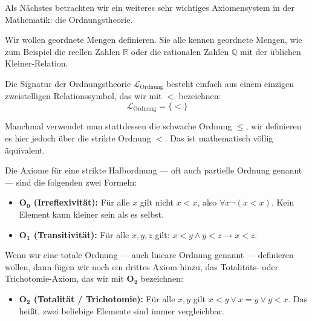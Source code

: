 \begin{spoken-clean}[01:20:42 - 01:23:42]
Als Nächstes betrachten wir ein weiteres sehr wichtiges Axiomensystem in der Mathematik: die Ordnungstheorie. 

Wir wollen geordnete Mengen definieren. Sie alle kennen geordnete Mengen, wie zum Beispiel die reellen Zahlen $\mathbb{R}$ oder die rationalen Zahlen $\mathbb{Q}$ mit der üblichen Kleiner-Relation. 

Die Signatur der Ordnungstheorie $\mathcal{L}_{\text{Ordnung}}$ besteht einfach aus einem einzigen zweistelligen Relationssymbol, das wir mit $<$ bezeichnen:
\[ \mathcal{L}_{\text{Ordnung}} = \{<\} \]

Manchmal verwendet man stattdessen die schwache Ordnung $\le$, wir definieren es hier jedoch über die strikte Ordnung $<$. Das ist mathematisch völlig äquivalent. 

Die Axiome für eine strikte Halbordnung --- oft auch partielle Ordnung genannt --- sind die folgenden zwei Formeln:
\begin{itemize}
    \item \textbf{O$_{\mathbf{0}}$ (Irreflexivität):} Für alle $x$ gilt nicht $x < x$, also $\forall x \neg(x < x)$. Kein Element kann kleiner sein als es selbst.
    \item \textbf{O$_{\mathbf{1}}$ (Transitivität):} Für alle $x, y, z$ gilt: $x < y \wedge y < z \rightarrow x < z$.
\end{itemize}

Wenn wir eine totale Ordnung --- auch lineare Ordnung genannt --- definieren wollen, dann fügen wir noch ein drittes Axiom hinzu, das Totalitäts- oder Trichotomie-Axiom, das wir mit $\mathbf{O_2}$ bezeichnen:
\begin{itemize}
    \item \textbf{O$_{\mathbf{2}}$ (Totalität / Trichotomie):} Für alle $x, y$ gilt $x < y \vee x = y \vee y < x$. Das heißt, zwei beliebige Elemente sind immer vergleichbar.
\end{itemize}
\end{spoken-clean}

